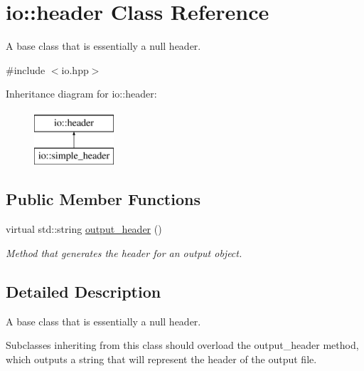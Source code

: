 \hypertarget{classio_1_1header}{\section{io\-:\-:header Class Reference}
\label{classio_1_1header}
}


A base class that is essentially a null header.  




{\ttfamily \#include $<$io.\-hpp$>$}

Inheritance diagram for io\-:\-:header\-:\begin{figure}[H]
\begin{center}
\leavevmode
\includegraphics[height=2.000000cm]{classio_1_1header}
\end{center}
\end{figure}
\subsection*{Public Member Functions}
\begin{DoxyCompactItemize}
\item 
virtual std\-::string \hyperlink{classio_1_1header_af7535d58a31712cdfb753ab0f19626f1}{output\-\_\-header} ()
\begin{DoxyCompactList}\small\item\em Method that generates the header for an output object. \end{DoxyCompactList}\end{DoxyCompactItemize}


\subsection{Detailed Description}
A base class that is essentially a null header. 



 Subclasses inheriting from this class should overload the output\-\_\-header method, which outputs a string that will represent the header of the output file. 

